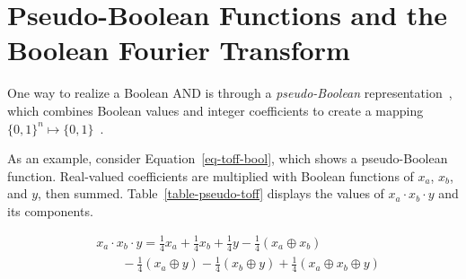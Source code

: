 \documentclass[a4paper]{article}
\begin{document}
\vspace{0.5cm}

\section{Pseudo-Boolean Functions and the Boolean Fourier Transform}

\vspace{0.3cm}

One way to realize a Boolean AND is through a {\it pseudo-Boolean} representation~\cite{bib-barenco-elementary,bib-amy-cnot}, which combines Boolean values and integer coefficients to create a mapping $\{0,1\}^n \mapsto \{0,1\}$~\cite{bib-amy-rm}.

\vspace{0.3cm}

As an example, consider Equation~\ref{eq-toff-bool}, which shows a pseudo-Boolean function. Real-valued coefficients are multiplied with Boolean functions of $x_a$, $x_b$, and $y$, then summed. Table~\ref{table-pseudo-toff} displays the values of $x_a \cdot x_b \cdot y$ and its components.

\vspace{0.2cm}

\begin{equation}
  \label{eq-toff-bool}
  \begin{aligned}
    &x_a \cdot x_b \cdot y = \frac{1}{4}x_a + \frac{1}{4}x_b + \frac{1}{4}y - \frac{1}{4}(x_a \oplus x_b) \\
    &\qquad -\frac{1}{4}(x_a \oplus y) - \frac{1}{4}(x_b \oplus y) + \frac{1}{4}(x_a \oplus x_b \oplus y)
  \end{aligned}
\end{equation}
\end{document}
